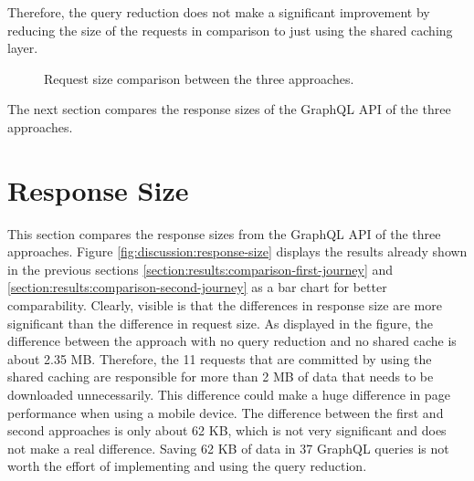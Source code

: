 \bigskip

\noindent Therefore, the query reduction does not make a significant improvement by reducing the size of the requests in comparison to just using the shared caching layer.

\begin{figure}[H]
  \centering
  \caption{Request size comparison between the three approaches.}\label{fig:discussion:request-size}
\end{figure}

\noindent The next section compares the response sizes of the GraphQL \ac{API} of the three approaches.

\section{Response Size}\label{section:discussion:response-size}

This section compares the response sizes from the GraphQL \ac{API} of the three approaches. Figure \ref{fig:discussion:response-size} displays the results already shown in the previous sections \ref{section:results:comparison-first-journey} and \ref{section:results:comparison-second-journey} as a bar chart for better comparability. Clearly, visible is that the differences in response size are more significant than the difference in request size. As displayed in the figure, the difference between the approach with no query reduction and no shared cache is about 2.35 MB. Therefore, the 11 requests that are committed by using the shared caching are responsible for more than 2 MB of data that needs to be downloaded unnecessarily. This difference could make a huge difference in page performance when using a mobile device. The difference between the first and second approaches is only about 62 KB, which is not very significant and does not make a real difference. Saving 62 KB of data in 37 GraphQL queries is not worth the effort of implementing and using the query reduction. 

